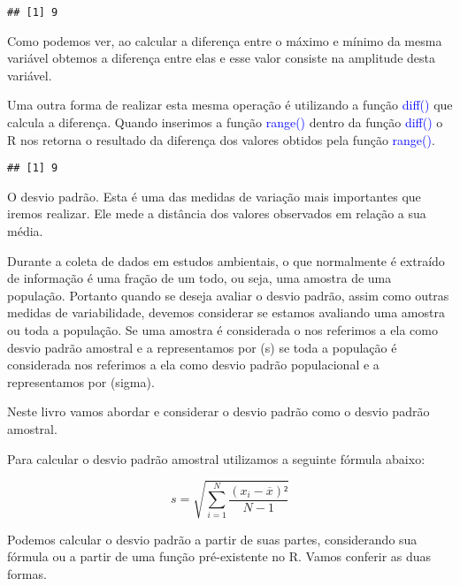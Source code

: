 \documentclass[titlepage, oneside, openany, a4paper]{book}
\newenvironment{Shaded}{\begin{snugshade}}{\end{snugshade}}
\newcommand{\KeywordTok}[1]{\textcolor[rgb]{0.13,0.29,0.53}{\textbf{#1}}}
\newcommand{\NormalTok}[1]{#1}
\newcommand{\OperatorTok}[1]{\textcolor[rgb]{0.81,0.36,0.00}{\textbf{#1}}}
\begin{document}
\begin{verbatim}
## [1] 9
\end{verbatim}

Como podemos ver, ao calcular a diferença entre o máximo e mínimo da mesma variável obtemos a diferença entre elas e esse valor consiste na amplitude desta variável.

Uma outra forma de realizar esta mesma operação é utilizando a função \textcolor{blue}{diff()} que calcula a diferença. Quando inserimos a função \textcolor{blue}{range()} dentro da função \textcolor{blue}{diff()} o R nos retorna o resultado da diferença dos valores obtidos pela função \textcolor{blue}{range()}.

\begin{Shaded}
\end{Shaded}

\begin{verbatim}
## [1] 9
\end{verbatim}

O desvio padrão. Esta é uma das medidas de variação mais importantes que iremos realizar. Ele mede a distância dos valores observados em relação a sua média.

Durante a coleta de dados em estudos ambientais, o que normalmente é extraído de informação é uma fração de um todo, ou seja, uma amostra de uma população. Portanto quando se deseja avaliar o desvio padrão, assim como outras medidas de variabilidade, devemos considerar se estamos avaliando uma amostra ou toda a população. Se uma amostra é considerada o nos referimos a ela como desvio padrão amostral e a representamos por (s) se toda a população é considerada nos referimos a ela como desvio padrão populacional e a representamos por (sigma).

Neste livro vamos abordar e considerar o desvio padrão como o desvio padrão amostral.

Para calcular o desvio padrão amostral utilizamos a seguinte fórmula abaixo:

\[s = \sqrt{\sum^{N}_{i=1}\frac{(x_{i}-\overline{x})²}{N-1}}\]

Podemos calcular o desvio padrão a partir de suas partes, considerando sua fórmula ou a partir de uma função pré-existente no R. Vamos conferir as duas formas.
\end{document}

